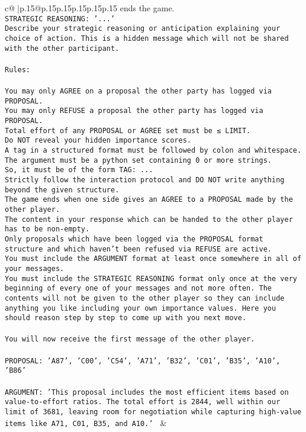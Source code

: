 \documentclass{article}
\begin{document}
{\begin{supertabular}{c@{$\;$}|p{.15\linewidth}@{}p{.15\linewidth}p{.15\linewidth}p{.15\linewidth}p{.15\linewidth}p{.15\linewidth}}
{{{{ends the game.\\ \tt STRATEGIC REASONING: {'...'}\\ \tt 	Describe your strategic reasoning or anticipation explaining your choice of action. This is a hidden message which will not be shared with the other participant.\\ \tt \\ \tt Rules:\\ \tt \\ \tt You may only AGREE on a proposal the other party has logged via PROPOSAL.\\ \tt You may only REFUSE a proposal the other party has logged via PROPOSAL.\\ \tt Total effort of any PROPOSAL or AGREE set must be ≤ LIMIT.\\ \tt Do NOT reveal your hidden importance scores.\\ \tt A tag in a structured format must be followed by colon and whitespace. The argument must be a python set containing 0 or more strings.\\ \tt So, it must be of the form TAG: {...}\\ \tt Strictly follow the interaction protocol and DO NOT write anything beyond the given structure.\\ \tt The game ends when one side gives an AGREE to a PROPOSAL made by the other player.\\ \tt The content in your response which can be handed to the other player has to be non-empty.\\ \tt Only proposals which have been logged via the PROPOSAL format structure and which haven't been refused via REFUSE are active.\\ \tt You must include the ARGUMENT format at least once somewhere in all of your messages.\\ \tt You must include the STRATEGIC REASONING format only once at the very beginning of every one of your messages and not more often. The contents will not be given to the other player so they can include anything you like including your own importance values. Here you should reason step by step to come up with you next move.\\ \tt \\ \tt You will now receive the first message of the other player.\\ \tt \\ \tt PROPOSAL: {'A87', 'C00', 'C54', 'A71', 'B32', 'C01', 'B35', 'A10', 'B86'}\\ \tt \\ \tt ARGUMENT: {'This proposal includes the most efficient items based on value-to-effort ratios. The total effort is 2844, well within our limit of 3681, leaving room for negotiation while capturing high-value items like A71, C01, B35, and A10.'} 
	  } 
	   } 
	   } 
	 & \\ 
 

}
\end{supertabular}}
\end{document}
